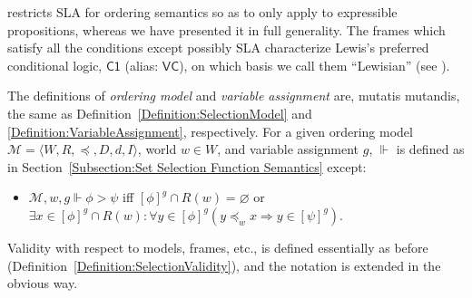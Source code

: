 \documentclass[12pt]{article}
\newcommand{\tup}[1]{\langle #1 \rangle}
\newcommand{\would}{\mathbin{>}}
\begin{document}

\cite[p.~77]{Lewis1971} restricts SLA for ordering semantics so as to only apply to expressible propositions, whereas we have presented it in full generality. 
The frames which satisfy all the conditions except possibly SLA characterize Lewis's preferred conditional logic, $\mathsf{C1}$ (alias: $\mathsf{VC}$), on which basis we call them ``Lewisian'' (see \cite[p.~83]{Lewis1971}).

The definitions of \emph{ordering model} and \emph{variable assignment} are, mutatis mutandis, the same as Definition~\ref{Definition:SelectionModel} and \ref{Definition:VariableAssignment}, respectively. 
For a given ordering model $\mathcal{M} = \tup{W,R,\preceq,D,d,I}$, world $w\in W$, and variable assignment $g$, $\Vdash$ is defined as in Section~\ref{Subsection:Set Selection Function Semantics} except:
\begin{itemize}
    \item[$\would$.] $\mathcal{M},w,g \Vdash \phi \would \psi$ iff $[\phi]^{g}\cap R(w)=\varnothing$ or $\exists{x}\in [\phi]^{g}\cap R(w): \forall{y}\in [\phi]^{g}(y\preceq_{w}x \Rightarrow y \in [\psi]^{g})$.
\end{itemize}
Validity with respect to models, frames, etc., is defined essentially as before (Definition~\ref{Definition:SelectionValidity}), and the notation is extended in the obvious way. 
\end{document}
